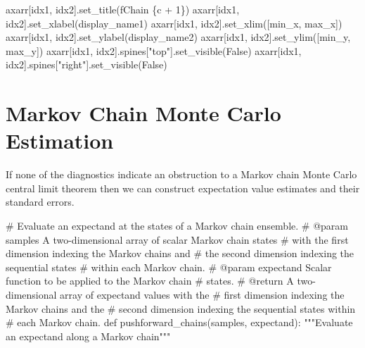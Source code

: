 \documentclass[
  letterpaper,
  DIV=11,
  numbers=noendperiod]{scrartcl}
\newenvironment{Shaded}{\begin{snugshade}}{\end{snugshade}}
\newcommand{\CommentTok}[1]{\textcolor[rgb]{0.37,0.37,0.37}{#1}}
\newcommand{\DecValTok}[1]{\textcolor[rgb]{0.68,0.00,0.00}{#1}}
\newcommand{\KeywordTok}[1]{\textcolor[rgb]{0.00,0.23,0.31}{#1}}
\newcommand{\NormalTok}[1]{\textcolor[rgb]{0.00,0.23,0.31}{#1}}
\newcommand{\OperatorTok}[1]{\textcolor[rgb]{0.37,0.37,0.37}{#1}}
\newcommand{\SpecialCharTok}[1]{\textcolor[rgb]{0.37,0.37,0.37}{#1}}
\newcommand{\SpecialStringTok}[1]{\textcolor[rgb]{0.13,0.47,0.30}{#1}}
\newcommand{\StringTok}[1]{\textcolor[rgb]{0.13,0.47,0.30}{#1}}
\newcommand{\VariableTok}[1]{\textcolor[rgb]{0.07,0.07,0.07}{#1}}
\begin{document}
\begin{Shaded}
\begin{Highlighting}[]
\NormalTok{    axarr[idx1, idx2].set\_title(}\SpecialStringTok{f\textquotesingle{}Chain }\SpecialCharTok{\{}\NormalTok{c }\OperatorTok{+} \DecValTok{1}\SpecialCharTok{\}}\SpecialStringTok{\textquotesingle{}}\NormalTok{)}
\NormalTok{    axarr[idx1, idx2].set\_xlabel(display\_name1)}
\NormalTok{    axarr[idx1, idx2].set\_xlim([min\_x, max\_x])}
\NormalTok{    axarr[idx1, idx2].set\_ylabel(display\_name2)}
\NormalTok{    axarr[idx1, idx2].set\_ylim([min\_y, max\_y])}
\NormalTok{    axarr[idx1, idx2].spines[}\StringTok{"top"}\NormalTok{].set\_visible(}\VariableTok{False}\NormalTok{)}
\NormalTok{    axarr[idx1, idx2].spines[}\StringTok{"right"}\NormalTok{].set\_visible(}\VariableTok{False}\NormalTok{)}
  
\end{Highlighting}
\end{Shaded}

\hypertarget{markov-chain-monte-carlo-estimation}{%
\section{Markov Chain Monte Carlo
Estimation}\label{markov-chain-monte-carlo-estimation}}

If none of the diagnostics indicate an obstruction to a Markov chain
Monte Carlo central limit theorem then we can construct expectation
value estimates and their standard errors.

\begin{Shaded}
\begin{Highlighting}[]

\CommentTok{\# Evaluate an expectand at the states of a Markov chain ensemble.}
\CommentTok{\# @param samples A two{-}dimensional array of scalar Markov chain states }
\CommentTok{\#                with the first dimension indexing the Markov chains and }
\CommentTok{\#                the second dimension indexing the sequential states }
\CommentTok{\#                within each Markov chain.}
\CommentTok{\# @param expectand Scalar function to be applied to the Markov chain }
\CommentTok{\#                  states.}
\CommentTok{\# @return A two{-}dimensional array of expectand values with the }
\CommentTok{\#         first dimension indexing the Markov chains and the }
\CommentTok{\#         second dimension indexing the sequential states within }
\CommentTok{\#         each Markov chain.}
\KeywordTok{def}\NormalTok{ pushforward\_chains(samples, expectand):}
  \CommentTok{"""Evaluate an expectand along a Markov chain"""}
\end{Highlighting}
\end{Shaded}
\end{document}
